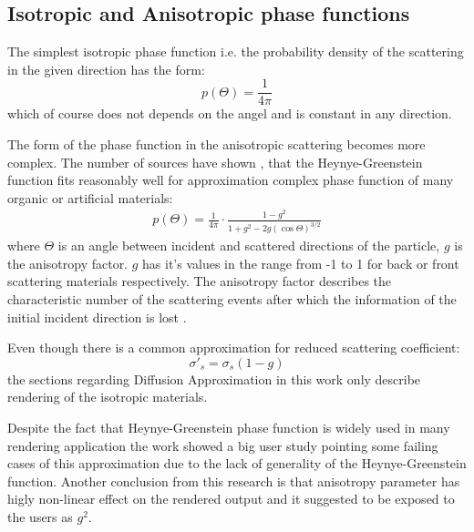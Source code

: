 \subsection{Isotropic and Anisotropic phase functions}
\label{section:phasefunction}

The simplest isotropic phase function i.e. the probability density of the scattering in the given
direction has the form:
\[
p(\Theta) = \frac{1}{4\pi}
\]
which of course does not depends on the angel and is constant in any direction.

The form of the phase function in the anisotropic scattering becomes more complex. The number of
sources have shown \cite{0031-9155-51-17-N04}, \cite{Gkioulekas:2013:URP:2516971.2516972} that the
Heynye-Greenstein function fits reasonably well for approximation complex phase function of many
organic or artificial materials:
\begin{align}
\label{eq:hg_pdf_theory}
p(\Theta) = \frac{1}{4\pi}\cdot\frac{1-g^2}{1+g^2-2g(\cos{\Theta})^{3/2}}
\end{align}
where $\Theta$ is an angle between incident and scattered directions of the particle, $g$ is the
anisotropy factor. $g$ has it's values in the range from -1 to 1 for back or front scattering
materials respectively. The anisotropy factor describes the characteristic number of the scattering
events after which the information of the initial incident direction is lost
\cite{wang2007biomedical}.

Even though there is a common approximation for reduced scattering coefficient:
\[
\sigma\prime_s = \sigma_s(1 - g)
\]
the sections regarding Diffusion Approximation in this work only describe rendering of the isotropic
materials.

Despite the fact that Heynye-Greenstein phase function is widely used in many rendering application
the work \cite{Gkioulekas:2013:IVR:2508363.2508377} showed a big user study pointing some failing
cases of this approximation due to the lack of generality of the Heynye-Greenstein function. Another
conclusion from this research is that anisotropy parameter has higly non-linear effect on the
rendered output and it suggested to be exposed to the users as $g^2$.

